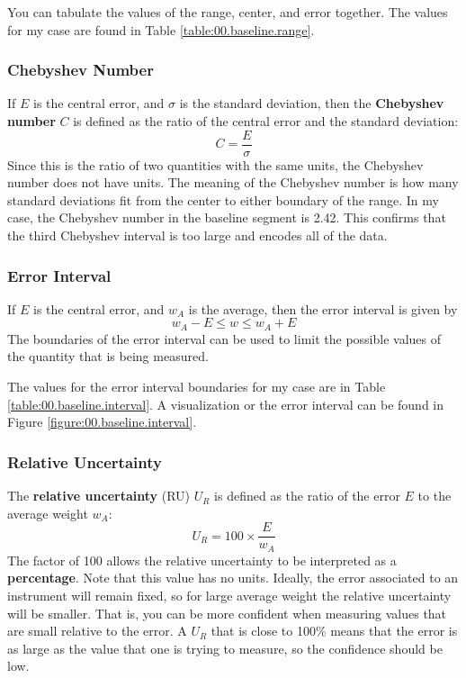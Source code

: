 You can tabulate the values of the range, center, and error together. The values for my case are found in Table \ref{table:00.baseline.range}.
%
\subsubsection{Chebyshev Number}
%
If $E$ is the central error, and $\sigma$ is the standard deviation, then the \textbf{Chebyshev number} $C$ is defined as the ratio of the central error and the standard deviation:
\begin{equation}
    C = \frac{E}{\sigma}
\end{equation}
Since this is the ratio of two quantities with the same units, the Chebyshev number does not have units. The meaning of the Chebyshev number is how many standard deviations fit from the center to either boundary of the range. In my case, the Chebyshev number in the baseline segment is 2.42. This confirms that the third Chebyshev interval is too large and encodes all of the data.
%
\subsubsection{Error Interval}
%
If $E$ is the central error, and $w_{A}$ is the average, then the error interval is given by
\begin{equation}
    w_{A} - E \leq w \leq w_{A} + E
\end{equation}
The boundaries of the error interval can be used to limit the possible values of the quantity that is being measured.

The values for the error interval boundaries for my case are in Table \ref{table:00.baseline.interval}. A visualization or the error interval can be found in Figure \ref{figure:00.baseline.interval}.
%
\subsubsection{Relative Uncertainty}
%
The \textbf{relative uncertainty} (RU) $U_{R}$ is defined as the ratio of the error $E$ to the average weight $w_{A}$:
\begin{equation}
    U_{R} = 100 \times \frac{E}{w_{A}}
\end{equation}
The factor of 100 allows the relative uncertainty to be interpreted as a \textbf{percentage}. Note that this value has no units. Ideally, the error associated to an instrument will remain fixed, so for large average weight the relative uncertainty will be smaller. That is, you can be more confident when measuring values that are small relative to the error. A $U_{R}$ that is close to 100\% means that the error is as large as the value that one is trying to measure, so the confidence should be low.

